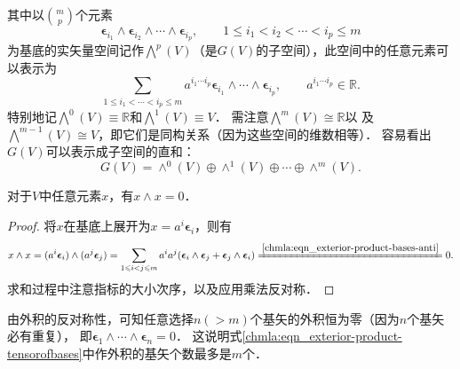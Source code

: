   


其中以$\binom{m}{p}$个元素
\begin{equation}\label{chmla:eqn_ep00}
     \boldsymbol{\epsilon}_{i_1} \wedge \boldsymbol{\epsilon}_{i_2} \wedge \cdots \wedge \boldsymbol{\epsilon}_{i_p},
     \qquad 1\leqslant {i_1} < {i_2} < \cdots <i_p  \leqslant m
\end{equation}
为基底的实矢量空间记作$\bigwedge^p(V)$（是$G(V)$的子空间），此空间中的任意元素可以表示为
\begin{equation}\label{chmla:eqn_ep10}
    \sum_{1\leqslant {i_1} < \cdots <i_p  \leqslant m } a^{i_1\cdots i_p}
    \boldsymbol{\epsilon}_{i_1} \wedge \cdots \wedge \boldsymbol{\epsilon}_{i_p},
    \qquad a^{i_1\cdots i_p} \in \mathbb{R} .
\end{equation}
特别地记$\bigwedge^0(V)\equiv\mathbb{R}$和$\bigwedge^1(V)\equiv V$．
需注意$\bigwedge^m(V) \cong \mathbb{R}$以
及$\bigwedge^{m-1}(V) \cong V$，即它们是同构关系（因为这些空间的维数相等）．
容易看出$G(V)$可以表示成子空间的直和：
\begin{equation}
    G(V)= \wedge^0(V) \oplus \wedge^1(V) \oplus \cdots \oplus \wedge^m(V) .
\end{equation}


\begin{proposition}
    对于$V$中任意元素$x$，有$x\wedge x=0$．
\end{proposition}
\begin{proof}
    将$x$在基底上展开为$x=a^i \boldsymbol{\epsilon}_{i}$，则有
    \begin{align*}
        x\wedge x = (a^i \boldsymbol{\epsilon}_{i}) \wedge (a^j \boldsymbol{\epsilon}_{j})
        =\sum_{1\leqslant {i} < j  \leqslant m } a^i a^j
        (\boldsymbol{\epsilon}_{i} \wedge \boldsymbol{\epsilon}_{j}+
        \boldsymbol{\epsilon}_{j} \wedge \boldsymbol{\epsilon}_{i})
        \xlongequal{\ref{chmla:eqn_exterior-product-bases-anti}}0 .
    \end{align*}
    求和过程中注意指标的大小次序，以及应用乘法反对称．
\end{proof}

\begin{remark}
    由外积的反对称性，可知任意选择$n(>m)$个基矢的外积恒为零（因为$n$个基矢必有重复），
    即$\boldsymbol{\epsilon}_{1} \wedge \cdots \wedge \boldsymbol{\epsilon}_{n}=0$．
    这说明式\eqref{chmla:eqn_exterior-product-tensorofbases}中作外积的基矢个数最多是$m$个．
\end{remark}


